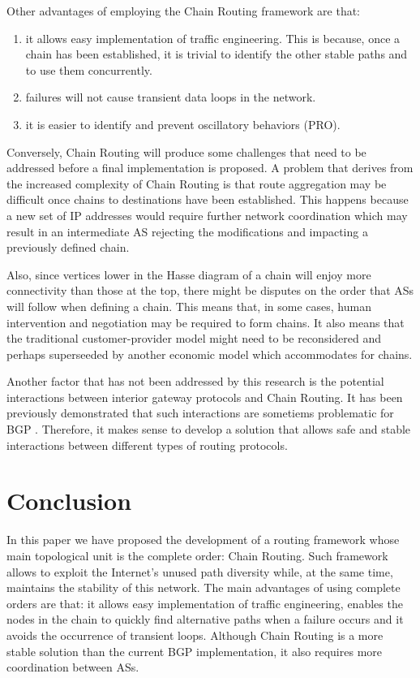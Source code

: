 \documentclass[5p,twocolumn]{elsarticle}
\begin{document}
Other advantages of employing the Chain Routing framework are that:

\begin{enumerate}
	\item it allows easy implementation of traffic engineering. This is because, once a chain has been established, it is trivial to identify the other stable paths and to use them concurrently.
	\item failures will not cause transient data loops in the network.
	\item it is easier to identify and prevent oscillatory behaviors (PRO).
\end{enumerate}

Conversely, Chain Routing will produce some challenges that need to be addressed before a final implementation is proposed. A problem that derives from the increased complexity of Chain Routing is that route aggregation may be difficult once chains to destinations have been established. This happens because a new set of IP addresses would require further network coordination which may result in an intermediate AS rejecting the modifications and impacting a previously defined chain.

Also, since vertices lower in the Hasse diagram of a chain will enjoy more connectivity than those at the top, there might be disputes on the order that ASs will follow when defining a chain. This means that, in some cases, human intervention and negotiation may be required to form chains. It also means that the traditional customer-provider model \cite{Gao2000a} might need to be reconsidered and perhaps superseeded by another economic model which accommodates for chains.

Another factor that has not been addressed by this research is the potential interactions between interior gateway protocols and Chain Routing. It has been previously demonstrated that such interactions are sometiems problematic for BGP \cite{Labovitz1999}. Therefore, it makes sense to develop a solution that allows safe and stable interactions between different types of routing protocols. 




\section{Conclusion}\label{conclusion}

In this paper we have proposed the development of a routing framework whose main topological unit is the complete order: Chain Routing. Such framework allows to exploit the Internet's unused path diversity while, at the same time, maintains the stability of this network. The main advantages of using complete orders are that: it allows easy implementation of traffic engineering, enables the nodes in the chain to quickly find alternative paths when a failure occurs and it avoids the occurrence of transient loops. Although Chain Routing is a more stable solution than the current BGP implementation, it also requires more coordination between ASs.
\end{document}
